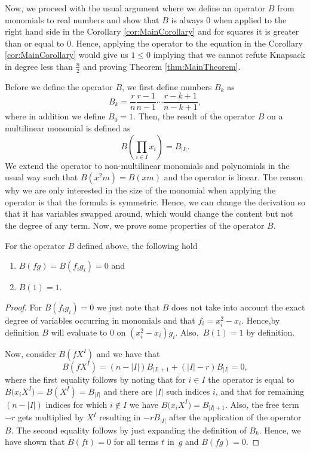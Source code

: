 \documentclass[a4paper,twoside,justified]{tufte-handout}
\begin{document}
Now, we proceed with the usual argument where we define an operator
$B$ from monomials to real numbers and show that $B$ is always $0$
when applied to the right hand side in the Corollary
\ref{cor:MainCorollary} and for squares it is greater than or equal to
$0$. Hence, applying the operator to the equation in the Corollary
\ref{cor:MainCorollary} would give us $1 \leq 0$ implying that we
cannot refute Knapsack in degree less than $\frac{n}{2}$ and proving
Theorem \ref{thm:MainTheorem}.

Before we define the operator $B$, we first define numbers $B_k$ as
\begin{equation}
  B_k = \frac{r}{n} \frac{r - 1}{n - 1} \cdots \frac{r - k + 1}{n - k + 1},
\end{equation}
where in addition we define $B_0 = 1$. Then, the result of the
operator $B$ on a multilinear monomial is defined as
\begin{equation}
  B\left(\prod_{i \in I} x_i\right) = B_{|I|}.
\end{equation}
We extend the operator to non-multilinear monomials and polynomials in
the usual way such that $B(x^2 m) = B(x m)$ and the operator is
linear. The reason why we are only interested in the size of the
monomial when applying the operator is that the formula is
symmetric. Hence, we can change the derivation so that it has
variables swapped around, which would change the content but not the
degree of any term. Now, we prove some properties of the operator $B$.

\begin{proposition}\label{prop:MainProposition}
  For the operator $B$ defined above, the following hold
  \begin{enumerate}
  \item\label{p:1} $B(f g) = B(f_i g_i) = 0$ and
  \item\label{p:2} $B(1) = 1$.
  \end{enumerate}
\end{proposition}
\begin{proof}  
  For $B(f_i g_i) = 0$ we just note that $B$ does not take into
  account the exact degree of variables occurring in monomials and that
  $f_i = x_i^2 - x_i$. Hence,by definition $B$ will evaluate to $0$ on
  $(x_i^2 - x_i) g_i$. Also,~$B(1) = 1$ by definition.
  
  Now, consider $B(f X^I)$ and we have that
  \begin{equation}
    B(f X^I) = (n - |I|) B_{|I| + 1} + (|I| - r) B_{|I|} = 0,
  \end{equation}
  where the first equality follows by noting that for $i \in I$ the
  operator is equal to~$B\bigl(x_i X^I\bigr) = B(X^I) = B_{|I|}$ and
  there are $|I|$ such indices $i$, and that for remaining $(n - |I|)$
  indices for which $i \notin I$ we have $B\bigl(x_i X^I\bigr) =
  B_{|I| + 1}$. Also, the free term $-r$ gets multiplied by $X^I$
  resulting in $-r B_{|I|}$ after the application of the
  operator~$B$. The second equality follows by just expanding the
  definition of $B_k$. Hence, we have shown that $B(f t) = 0$ for all
  terms $t$ in~$g$ and $B(f g) = 0$.
\end{proof}
\end{document}
